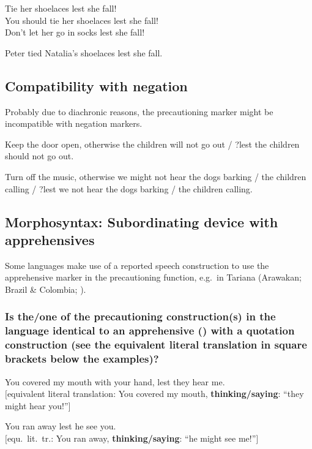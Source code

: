 \documentclass[output=paper,colorlinks,citecolor=brown]{langscibook}
\begin{document}
\ea \label{p51}
\ea \label{p51a} Tie her shoelaces lest she fall! \\
\ex \label{p51b} You should tie her shoelaces lest she fall!\\
\ex \label{p51c} Don't let her go in socks lest she fall!
\z
\z

\ea \label{p52} Peter tied Natalia's shoelaces lest she fall.
\z




\subsection{Compatibility with negation}
\label{subsec:prenegation}

Probably due to diachronic reasons, the precautioning marker might be incompatible with negation markers.

\ea \label{p53} Keep the door open, otherwise the children will not go out \textnormal{/ ?}lest the children should not go out.
\z

\ea \label{p54} Turn off the music, otherwise we might not hear the dogs barking \textnormal{/} the children calling  \textnormal{/ ?}lest we not hear the dogs barking \textnormal{/} the children calling.
\z

\subsection{Morphosyntax: Subordinating device with apprehensives}
\label{subsec:premorphosyntax}

Some languages make use of a reported speech construction to use the apprehensive marker in the precautioning function, e.g.\ in Tariana (Arawakan; Brazil \& Colombia; \cite[386]{aikhenvald2003}).


\subsubsection{Is the/one of the precautioning construction(s) in the language identical to an apprehensive () with a quotation construction (see the equivalent literal translation in square brackets below the examples)?}
\label{2.5.1}

\ea \label{p55} You covered my mouth with your hand, lest they hear me.\\
\textnormal{$[$equivalent literal translation: You covered my mouth, \textbf{thinking/saying}: ``they might hear you!''$]$}
\z

\ea \label{p56} You ran away lest he see you. \\
\textnormal{$[$equ.\ lit.\ tr.: You ran away, \textbf{thinking/saying}: ``he might see me!''$]$}
\z
\end{document}
